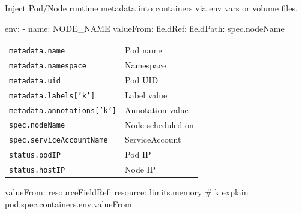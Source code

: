 Inject Pod/Node runtime metadata into containers via env vars or volume files.

\begin{cheatcodebash}
env:
- name: NODE_NAME
  valueFrom:
    fieldRef:
      fieldPath: spec.nodeName
\end{cheatcodebash}

\begin{cheatcodetex}
  \ttfamily\fontsize{6.5}{7.5}\selectfont
  \begin{tabular}{@{}ll@{}}
    \texttt{metadata.name}              & Pod name \\
    \texttt{metadata.namespace}         & Namespace \\
    \texttt{metadata.uid}               & Pod UID \\
    \texttt{metadata.labels['k']}       & Label value \\
    \texttt{metadata.annotations['k']}  & Annotation value \\
    \texttt{spec.nodeName}              & Node scheduled on \\
    \texttt{spec.serviceAccountName}    & ServiceAccount \\
    \texttt{status.podIP}               & Pod IP \\
    \texttt{status.hostIP}              & Node IP \\
  \end{tabular}
\end{cheatcodetex}

\begin{cheatcodebash}
valueFrom:
  resourceFieldRef: {resource: limits.memory}
# k explain pod.spec.containers.env.valueFrom
\end{cheatcodebash}
